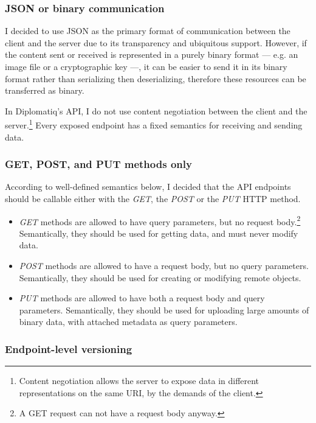 \subsubsection{JSON or binary communication}

I decided to use JSON as the primary format of communication between the client and the server due to its transparency and ubiquitous support. However, if the content sent or received is represented in a purely binary format — e.g. an image file or a cryptographic key —, it can be easier to send it in its binary format rather than serializing then deserializing, therefore these resources can be transferred as binary.

In Diplomatiq's API, I do not use content negotiation between the client and the server.\footnote{Content negotiation allows the server to expose data in different representations on the same URI, by the demands of the client.} Every exposed endpoint has a fixed semantics for receiving and sending data.

\subsubsection{GET, POST, and PUT methods only}

According to well-defined semantics below, I decided that the API endpoints should be callable either with the \emph{GET}, the \emph{POST} or the \emph{PUT} HTTP method.

\begin{itemize}
\item \emph{GET} methods are allowed to have query parameters, but no request body.\footnote{A GET request can not have a request body anyway.} Semantically, they should be used for getting data, and must never modify data.
\item \emph{POST} methods are allowed to have a request body, but no query parameters. Semantically, they should be used for creating or modifying remote objects.
\item \emph{PUT} methods are allowed to have both a request body and query parameters. Semantically, they should be used for uploading large amounts of binary data, with attached metadata as query parameters.
\end{itemize}

\subsubsection{Endpoint-level versioning}

